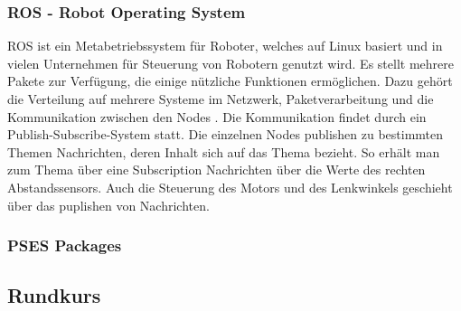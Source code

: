 \subsubsection{ROS - Robot Operating System}
\label{sec:ros}
ROS ist ein Metabetriebssystem für Roboter, welches auf Linux basiert und in vielen Unternehmen für Steuerung von Robotern genutzt wird. Es stellt mehrere Pakete zur Verfügung, die einige nützliche Funktionen ermöglichen. Dazu gehört die Verteilung auf mehrere Systeme im Netzwerk, Paketverarbeitung und die Kommunikation zwischen den Nodes \cite{einfuehrungROS}.
Die Kommunikation findet durch ein Publish-Subscribe-System statt. Die einzelnen Nodes publishen zu  bestimmten Themen Nachrichten, deren Inhalt sich auf das Thema bezieht. So erhält man zum Thema  über eine Subscription Nachrichten über die Werte des rechten Abstandssensors. Auch die Steuerung des Motors und des Lenkwinkels geschieht über das puplishen von Nachrichten. 

\subsubsection{PSES Packages}
\label{sec:psespackages}
\subsection{Rundkurs}
\label{sec:rundkurs}
